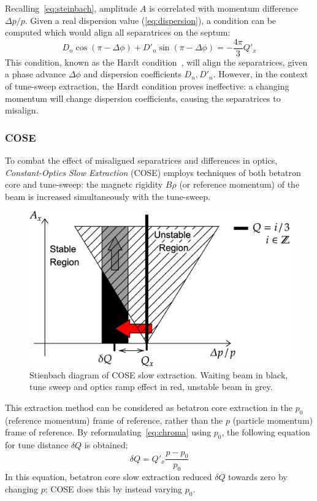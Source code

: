 \documentclass[11pt]{report}
\begin{document}
Recalling~\autoref{eq:steinbach}, amplitude $A$ is correlated with momentum difference $\Delta p/p$. Given a real dispersion value (\autoref{eq:dispersion}), a condition can be computed which would align all separatrices on the septum:
\begin{equation}
  D_n\cos(\pi-\Delta\phi)+D'_n\sin(\pi-\Delta\phi)=-\frac{4\pi}3Q'_x
  \label{eq:hardt}
\end{equation}
This condition, known as the Hardt condition~\cite{hardt}, will align the separatrices, given a phase advance $\Delta\phi$ and dispersion coefficients $D_n, D'_n$. However, in the context of tune-sweep extraction, the Hardt condition proves ineffective: a changing momentum will change dispersion coefficients, causing the separatrices to misalign.

\subsubsection{COSE}
To combat the effect of misaligned separatrices and differences in optics, \textit{Constant-Optics Slow Extraction} (COSE) employs techniques of both betatron core and tune-sweep: the magnetc rigidity $B\rho$ (or reference momentum) of the beam is increased simultaneously with the tune-sweep. 

\begin{figure}[h]
  \centering
  \includegraphics[width=0.6\linewidth]{cose.png}
  \caption{Stienbach diagram of COSE slow extraction. Waiting beam in black, tune sweep and optics ramp effect in red, unstable beam in grey.}\label{fig:cose}
\end{figure}

This extraction method can be considered as betatron core extraction in the $p_0$ (reference momentum) frame of reference, rather than the $p$ (particle momentum) frame of reference. By reformulating~\autoref{eq:chroma} using $p_0$, the following equation for tune distance $\delta Q$ is obtained:
\begin{equation}
  \delta Q=Q'_x\frac{p-p_0}{p_0}
\end{equation}
In this equation, betatron core slow extraction reduced $\delta Q$ towards zero by changing $p$; COSE does this by instead varying $p_0$. 
\end{document}
